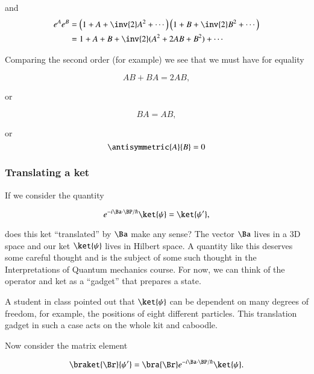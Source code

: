 and 
\begin{equation}\label{eqn:qmTwoL11:130}
\begin{aligned}
e^A e^B 
&= 
\left(1 + A + \inv{2}A^2 + \cdots\right)
\left(1 + B + \inv{2}B^2 + \cdots\right) \\
&= 1 + A + B + \inv{2}( A^2 + 2 A B + B^2 ) + \cdots
\end{aligned}
\end{equation}

Comparing the second order (for example) we see that we must have for equality

\begin{equation}\label{eqn:qmTwoL11:150}
A B + B A = 2 A B,
\end{equation}

or

\begin{equation}\label{eqn:qmTwoL11:170}
B A = A B,
\end{equation}

or
\begin{equation}\label{eqn:qmTwoL11:190}
\antisymmetric{A}{B} = 0
\end{equation}

\subsubsection{Translating a ket}

If we consider the quantity

\begin{equation}\label{eqn:qmTwoL11:210}
e^{-i \Ba \cdot \BP/\hbar} 
\ket{\psi} = \ket{\psi'} ,
\end{equation}

does this ket ``translated'' by $\Ba$ make any sense?  The vector $\Ba$ lives in a 3D space and our ket $\ket{\psi}$ lives in Hilbert space.  A quantity like this deserves some careful thought and is the subject of some such thought in the Interpretations of Quantum mechanics course.  For now, we can think of the operator and ket as a ``gadget'' that prepares a state.

A student in class pointed out that $\ket{\psi}$ can be dependent on many degrees of freedom, for example, the positions of eight different particles.  This translation gadget in such a case acts on the whole kit and caboodle.

Now consider the matrix element

\begin{equation}\label{eqn:qmTwoL11:230}
\braket{\Br}{\psi'} 
= \bra{\Br} e^{-i \Ba \cdot \BP/\hbar} \ket{\psi}.
\end{equation}

